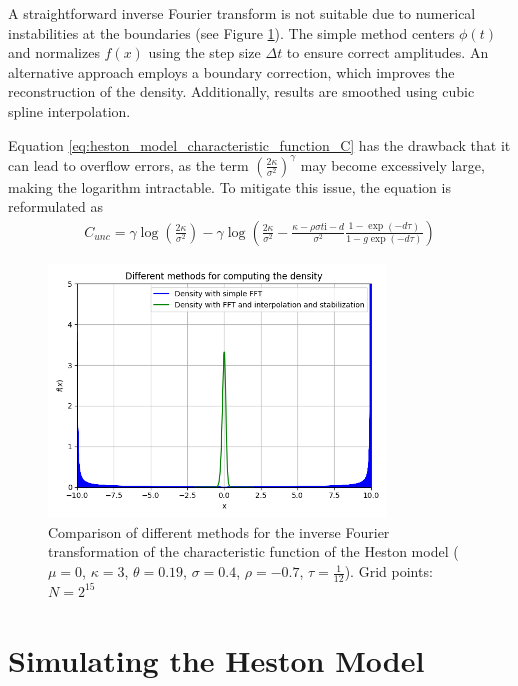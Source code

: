 A straightforward inverse Fourier transform is not suitable due to numerical instabilities at the boundaries (see Figure \ref{fig:ifft_comparison}). The simple method centers $\phi(t)$ and normalizes $f(x)$ using the step size $\Delta t$ to ensure correct amplitudes. An alternative approach employs a boundary correction, which improves the reconstruction of the density. Additionally, results are smoothed using cubic spline interpolation.

Equation \eqref{eq:heston_model_characteristic_function_C} has the drawback that it can lead to overflow errors, as the term $\left(\frac{2\kappa}{\sigma^2}\right)^\gamma$ may become excessively large, making the logarithm intractable. To mitigate this issue, the equation is reformulated as
\begin{align}
    \label{eq:heston_model_characteristic_function_C_2}
    C_{unc} = \gamma \log\left(\frac{2\kappa}{\sigma^2}\right) - \gamma \log\left(\frac{2\kappa}{\sigma^2} - \frac{\kappa - \rho\sigma t \mathrm{i} - d}{\sigma^2} \frac{1 - \exp(-d \tau)}{1 - g \exp(-d \tau)}\right)
\end{align}

\begin{figure}[h]
    \centering
    \includegraphics[width=0.8\textwidth]{img/different_ifft_methods.png}
    \caption{Comparison of different methods for the inverse Fourier transformation of the characteristic function of the Heston model ($\mu=0$, $\kappa=3$, $\theta=0.19$, $\sigma=0.4$, $\rho=-0.7$, $\tau=\frac{1}{12}$). Grid points: $N=2^{15}$}
    \label{fig:ifft_comparison}
\end{figure}

\section{Simulating the Heston Model}

